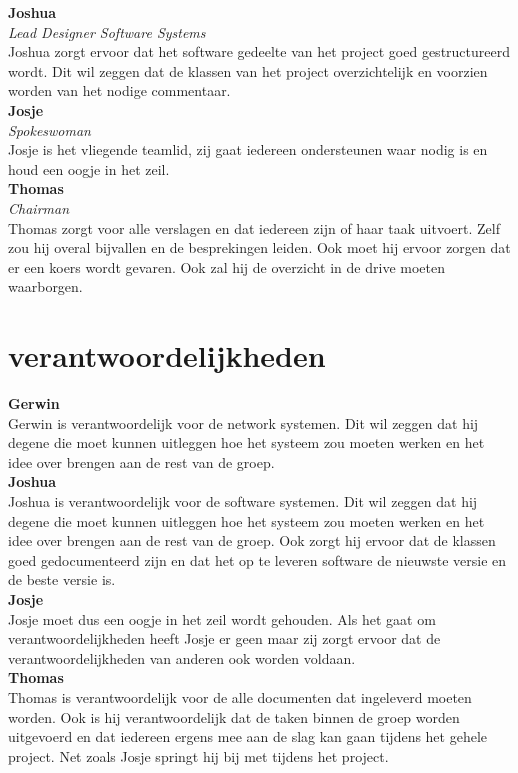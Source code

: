 \documentclass[12pt]{article}
\begin{document}
\noindent\textbf{Joshua} \\
\emph{Lead Designer Software Systems} \\
Joshua zorgt ervoor dat het software gedeelte van het project goed gestructureerd wordt. Dit wil zeggen dat de klassen van het project overzichtelijk en voorzien worden van het nodige commentaar.
\\

\noindent\textbf{Josje} \\
\emph{Spokeswoman} \\
Josje is het vliegende teamlid, zij gaat iedereen ondersteunen waar nodig is en houd een oogje in het zeil. 
\\

\noindent\textbf{Thomas} \\
\emph{Chairman} \\
Thomas zorgt voor alle verslagen en dat iedereen zijn of haar taak uitvoert. Zelf zou hij overal bijvallen en de besprekingen leiden. Ook moet hij ervoor zorgen dat er een koers wordt gevaren. Ook zal hij de overzicht in de drive moeten waarborgen.
\newpage

\section{verantwoordelijkheden}
\textbf{Gerwin} \\
Gerwin is verantwoordelijk voor de network systemen. Dit wil zeggen dat hij degene die moet kunnen uitleggen hoe het systeem zou moeten werken en het idee over brengen aan de rest van de groep.
\\

\noindent\textbf{Joshua} \\
Joshua is verantwoordelijk voor de software systemen. Dit wil zeggen dat hij degene die moet kunnen uitleggen hoe het systeem zou moeten werken en het idee over brengen aan de rest van de groep. Ook zorgt hij ervoor dat de klassen goed gedocumenteerd zijn en dat het op te leveren software de nieuwste versie en de beste versie is.
\\

\noindent\textbf{Josje} \\
Josje moet dus een oogje in het zeil wordt gehouden. Als het gaat om verantwoordelijkheden heeft Josje er geen maar zij zorgt ervoor dat de verantwoordelijkheden van anderen ook worden voldaan.
\\

\noindent\textbf{Thomas} \\
Thomas is verantwoordelijk voor de alle documenten dat ingeleverd moeten worden. Ook is hij verantwoordelijk dat de taken binnen de groep worden uitgevoerd en dat iedereen ergens mee aan de slag kan gaan tijdens het gehele project. Net zoals Josje springt hij bij met tijdens het project.
\newpage
\end{document}
